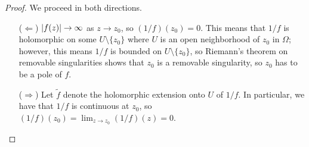 \begin{proof}
    We proceed in both directions.
    \begin{itemize}
        \item[($\Leftarrow$)] $\left\lvert f(z) \right\rvert \to \infty$ as $z \to z_0$, so $(1/f)(z_0) = 0$. This means that $1/f$ is holomorphic on some $U \setminus \{z_0\}$ where $U$ is an open neighborhood of $z_0$ in $\Omega$; however, this means $1/f$ is bounded on $U \setminus \{z_0\}$, so Riemann's theorem on removable singularities shows that $z_0$ is a removable singularity, so $z_0$ has to be a pole of $f$.
        \item[($\Rightarrow$)] Let $\tilde f$ denote the holomorphic extension onto $U$ of $1/f$. In particular, we have that $1/f$ is continuous at $z_0$, so $(1/f)(z_0) = \lim_{z \to z_0} (1/f)(z) = 0$. \qedhere
    \end{itemize}
\end{proof}
